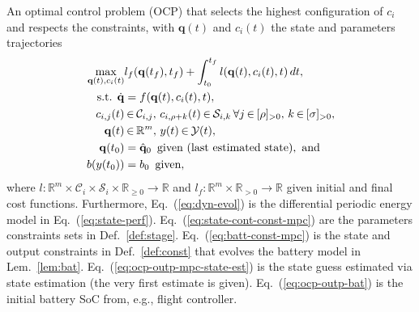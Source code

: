 \documentclass[letterpaper,10pt,journal,twoside]{IEEEtran}
\theoremstyle{definition}
\begin{document}
An optimal control problem (OCP) that selects the highest configuration of $c_i$ and respects the constraints, with $\mathbf{q}(t)$ and $c_i(t)$ the state and parameters trajectories
\begin{subequations}\label{eq:ocp-output-mpc}\begin{align}
  \max_{\mathbf{q}(t),c_i(t)}&{l_f(\mathbf{q}(t_f),t_f)+\int_{t_0}^{t_f}{l(\mathbf{q}(t),c_i(t),t)\,dt}},\label{eq:ocp-costs}\\
  \text{s.t. }\dot{\mathbf{q}}&=f(\mathbf{q}(t),c_i(t),t),\label{eq:dyn-evol}\\
  c_{i,j}(t)&\hspace*{-.2ex}\in\hspace*{-.2ex}\mathcal{C}_{i,j},\,c_{i,\rho+k}(t)\hspace*{-.2ex}\in\hspace*{-.2ex}\mathcal{S}_{i,k}\,\forall j\hspace*{-.2ex}\in\hspace*{-.2ex}[\rho]_{>0},\,k\hspace*{-.2ex}\in\hspace*{-.2ex}[\sigma]_{>0},\label{eq:state-cont-const-mpc}\\
  \mathbf{q}(t)&\hspace*{-.2ex}\in\hspace*{-.2ex}\mathbb{R}^m,\,y(t)\hspace*{-.2ex}\in\hspace*{-.2ex}\mathcal{Y}(t),\label{eq:batt-const-mpc}\\
  \mathbf{q}(t_0)&=\hat{\mathbf{q}}_0\,\,\,\text{given (last estimated state)},\text{ and}\label{eq:ocp-outp-mpc-state-est}\\
  b(y(t_0))&=b_0\,\,\,\text{given}\label{eq:ocp-outp-bat},
\end{align}\end{subequations}
where $l:\mathbb{R}^m\times\mathcal{C}_i\times\mathcal{S}_i\times\mathbb{R}_{\geq 0}\rightarrow\mathbb{R}$ and $l_f:\mathbb{R}^m\times\mathbb{R}_{> 0}\rightarrow\mathbb{R}$ given initial and final cost functions. Furthermore, Eq.~(\ref{eq:dyn-evol}) is the differential periodic energy model in Eq.~(\ref{eq:state-perf}). Eq.~(\ref{eq:state-cont-const-mpc}) are the parameters constraints sets in Def.~\ref{def:stage}. Eq.~(\ref{eq:batt-const-mpc}) is the state and output constraints in Def.~\ref{def:const} that evolves the battery model in Lem.~\ref{lem:bat}. Eq.~(\ref{eq:ocp-outp-mpc-state-est}) is the state guess estimated via state estimation %
(the very first estimate is given). Eq.~(\ref{eq:ocp-outp-bat}) is the initial battery SoC from, e.g., flight controller.
\end{document}
